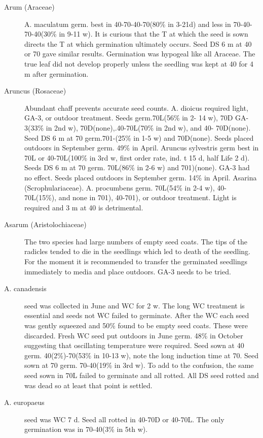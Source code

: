 \begin{description}
\item[Arum (Araceae)] A. maculatum germ. best in 40-70-40-70(80\% in 3-21d)
and less in 70-40-70-40(30\% in 9-11 w). It is curious that the T at which the seed is
sown directs the T at which germination ultimately occurs. Seed DS 6 m at 40 or 70
gave similar results. Germination was hypogeal like all Araceae. The true leaf did not
develop properly unless the seedling was kept at 40 for 4 m after germination.

\item[Aruncus (Rosaceae)] Abundant chaff prevents accurate seed counts.
A. dioicus required light, GA-3, or outdoor treatment. Seeds germ.70L(56\% in 2-
14 w), 70D GA-3(33\% in 2nd w), 70D(none),.40-70L(70\% in 2nd w), and 40-
70D(none). Seed DS 6 m at 70 germ.701-(25\% in 1-5 w) and 70D(none). Seeds
placed outdoors in September germ. 49\% in April.
Aruncus sylvestris germ best in 70L or 40-70L(100\% in 3rd w, first order rate,
ind. t 15 d, half Life 2 d). Seeds DS 6 m at 70 germ. 70L(86\% in 2-6 w) and 701)(none).
GA-3 had no effect. Seeds placed outdoors in September germ. 14\% in April.
Asarina (Scrophulariaceae). A. procumbens germ. 70L(54\% in 2-4 w), 40-
70L(15\%), and none in 701), 40-701), or outdoor treatment. Light is required and 3 m
at 40 is detrimental.

\item[Asarum (Aristolochiaceae)] The two species had large numbers of empty
seed coats. The tips of the radicles tended to die in the seedlings which led to death of
the seedling. For the moment it is recommended to transfer the germinated seedlings
immediately to media and place outdoors. GA-3 needs to be tried.

\item[A. canadensis] seed was collected in June and WC for 2 w. The long WC
treatment is essential and seeds not WC failed to germinate. After the WC each seed
was gently squeezed and 50\% found to be empty seed coats. These were discarded.
Fresh WC seed put outdoors in June germ. 48\% in October suggesting that oscillating
temperature were required. Seed sown at 40 germ. 40(2\%)-70(53\% in 10-13 w), note
the long induction time at 70. Seed sown at 70 germ. 70-40(19\% in 3rd w). To add to
the confusion, the same seed sown in 70L failed to germinate and all rotted. All DS
seed rotted and was dead so at least that point is settled.

\item[A. europaeus] seed was WC 7 d. Seed all rotted in 40-70D or 40-70L. The only
germination was in 70-40(3\% in 5th w).


\end{description}
